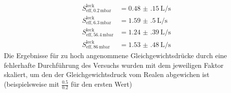 
\begin{align}
    S_{\text{eff}, 0.2\,\text{mbar}}^{\text{leck}}  &= \qty{0.48(15)}{\liter\per\second} \\
    S_{\text{eff}, 6.3\,\text{mbar}}^{\text{leck}}  &= \qty{1.59(50)}{\liter\per\second} \\
    S_{\text{eff}, 56.4\,\text{mbar}}^{\text{leck}} &= \qty{1.24(39)}{\liter\per\second} \\
    S_{\text{eff}, 86\,\text{mbar}}^{\text{leck}}   &= \qty{1.53(48)}{\liter\per\second}
\end{align}
Die Ergebnisse für zu hoch angenommene Gleichgewichtsdrücke durch eine fehlerhafte
Durchführung des Versuchs wurden mit dem jeweiligen Faktor skaliert, um den
der Gleichgewichtsdruck vom Realen abgewichen ist (beispielsweise mit 
$\frac{0.5}{0.2}$ für den ersten Wert)


